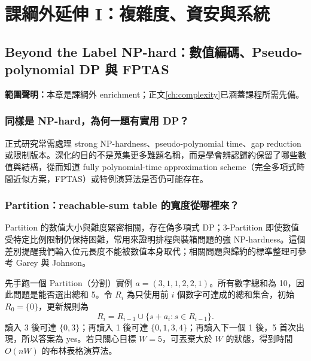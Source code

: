 \documentclass[11pt,a4paper,oneside,openany]{book}
\begin{document}
\appendix
\part{課綱外延伸 I：複雜度、資安與系統}

\chapter{Beyond the Label NP-hard：數值編碼、Pseudo-polynomial DP 與 FPTAS}
\label{app:npdeep}
\noindent\textbf{範圍聲明：}本章是課綱外 enrichment；正文\cref{ch:complexity}已涵蓋課程所需先備。

\section{同樣是 NP-hard，為何一題有實用 DP？}
正式研究常需處理 strong NP-hardness、pseudo-polynomial time、gap reduction 或限制版本。深化的目的不是蒐集更多難題名稱，而是學會辨認歸約保留了哪些數值與結構，從而知道 fully polynomial-time approximation scheme（完全多項式時間近似方案，FPTAS）或特例演算法是否仍可能存在。

\section{Partition：reachable-sum table 的寬度從哪裡來？}
Partition 的數值大小與難度緊密相關，存在偽多項式 DP；3-Partition 即使數值受特定比例限制仍保持困難，常用來證明排程與裝箱問題的強 NP-hardness。這個差別提醒我們輸入位元長度不能被數值本身取代；相關問題與歸約的標準整理可參考 Garey 與 Johnson\cite{garey-johnson}。

先手跑一個 Partition（分割）實例 $a=(3,1,1,2,2,1)$。所有數字總和為 10，因此問題是能否選出總和 5。令 $R_i$ 為只使用前 $i$ 個數字可達成的總和集合，初始 $R_0=\{0\}$，更新規則為
\[
 R_i=R_{i-1}\cup\{s+a_i:s\in R_{i-1}\}.
\]
讀入 3 後可達 $\{0,3\}$；再讀入 1 後可達 $\{0,1,3,4\}$；再讀入下一個 1 後，5 首次出現，所以答案為 yes。若只關心目標 $W=5$，可丟棄大於 $W$ 的狀態，得到時間 $O(nW)$ 的布林表格演算法。
\end{document}

